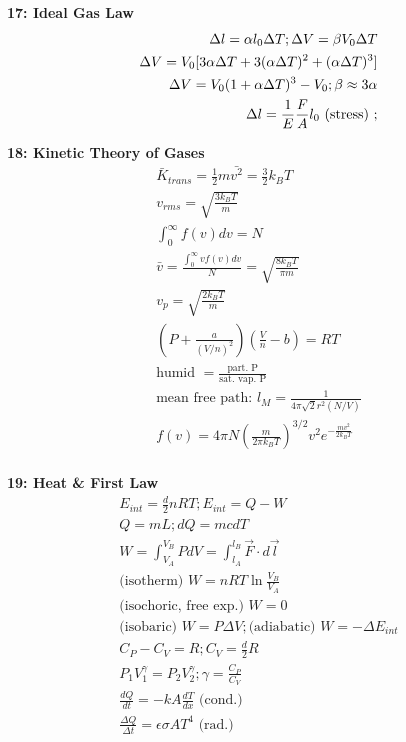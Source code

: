 \documentclass[twoside,draft]{article}
\begin{document}
\begin{multicols}{3}
  \textbf{17: Ideal Gas Law}
  \begin{align*}
    \Delta l = \alpha l_0 \Delta T;
    \Delta V = \beta V_0 \Delta T \\
    \Delta V = V_0 [3 \alpha \Delta T + 3 (\alpha \Delta T)^2 +
    (\alpha \Delta T)^3] \\
    \Delta V = V_0 (1 + \alpha \Delta T)^3 - V_0;
    \beta \approx 3 \alpha \\
    \Delta l = {1 \over E} {F \over A} l_0 \text{ (stress) };
  \end{align*}

  \textbf{18: Kinetic Theory of Gases}
  \begin{align*}
    \bar{K}_{trans} = \frac{1}{2} m \bar{v^2} = \frac{3}{2} k_B T \\
    v_{rms} = \sqrt{\frac{3k_BT}{m}} \\
    \int_0^\infty f(v) dv = N \\
    \bar{v} = \frac{\int_0^\infty vf(v) dv}{N} = \sqrt{\frac{8k_BT}{\pi m}} \\
    v_p = \sqrt{\frac{2k_BT}{m}} \\
    \left( P+\frac{a}{(V/n)^2} \right) \left( \frac{V}{n}-b \right) = RT \\
    \text{humid } = \frac{\text{part. P}}{\text{sat. vap. P}} \\
    \text{mean free path: } l_M = \frac{1}{4\pi\sqrt{2}r^2(N/V)} \\
    f(v) = 4 \pi N \left( \frac{m}{2 \pi k_BT} \right)^{3/2} v^2
  e^{-\frac{mv^2}{2k_BT}} \\
  \end{align*}

  \textbf{19: Heat \& First Law}
  \begin{align*}
    E_{int} = \frac{d}{2} nRT;
    E_{int} = Q - W \\
    Q = mL;
    dQ = mcdT \\
    W = \int_{V_A}^{V_B} P dV = \int_{l_A}^{l_B} \vec{F} \cdot d \vec{l} \\
    \text{(isotherm) } W = nRT \ln \frac{V_B}{V_A} \\
    \text{(isochoric, free exp.) } W = 0 \\
    \text{(isobaric) } W = P \Delta V; \text{(adiabatic) } W = -\Delta E_{int} \\
    C_P - C_V = R; C_V = \frac{d}{2} R \\
    P_1V_1^\gamma = P_2V_2^\gamma; \gamma = \frac{C_P}{C_V} \\
    \frac{dQ}{dt} = -kA \frac{dT}{dx} \text{ (cond.)} \\
    \frac{\Delta Q}{\Delta t} = \epsilon \sigma A T^4 \text{ (rad.)} \\
  \end{align*}


\end{multicols}
\end{document}
